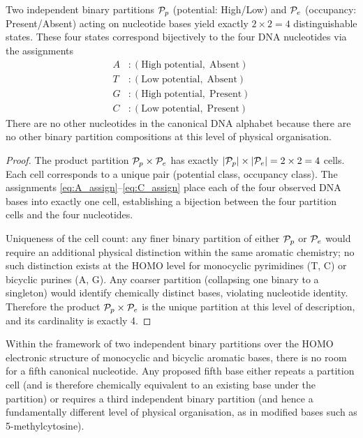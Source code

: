 \begin{theorem}
\label{thm:four_state}
Two independent binary partitions $\mathcal{P}_p$ (potential: High/Low) and
$\mathcal{P}_e$ (occupancy: Present/Absent) acting on nucleotide bases yield
exactly $2 \times 2 = 4$ distinguishable states. These four states
correspond bijectively to the four DNA nucleotides via the assignments
\begin{align}
  A &: (\mathrm{High\; potential},\; \mathrm{Absent}) \label{eq:A_assign}\\
  T &: (\mathrm{Low\; potential},\; \mathrm{Absent})  \label{eq:T_assign}\\
  G &: (\mathrm{High\; potential},\; \mathrm{Present})\label{eq:G_assign}\\
  C &: (\mathrm{Low\; potential},\; \mathrm{Present}) \label{eq:C_assign}
\end{align}
There are no other nucleotides in the canonical DNA alphabet because there
are no other binary partition compositions at this level of physical
organisation.
\end{theorem}

\begin{proof}
The product partition $\mathcal{P}_p \times \mathcal{P}_e$ has exactly
$|\mathcal{P}_p| \times |\mathcal{P}_e| = 2 \times 2 = 4$ cells.
Each cell corresponds to a unique pair (potential class, occupancy class).
The assignments \eqref{eq:A_assign}--\eqref{eq:C_assign} place each of the
four observed DNA bases into exactly one cell, establishing a bijection
between the four partition cells and the four nucleotides.

Uniqueness of the cell count: any finer binary partition of either
$\mathcal{P}_p$ or $\mathcal{P}_e$ would require an additional physical distinction
within the same aromatic chemistry; no such distinction exists at the HOMO
level for monocyclic pyrimidines (T, C) or bicyclic purines (A, G).
Any coarser partition (collapsing one binary to a singleton) would
identify chemically distinct bases, violating nucleotide identity.
Therefore the product $\mathcal{P}_p \times \mathcal{P}_e$ is the unique partition
at this level of description, and its cardinality is exactly 4.
\end{proof}

\begin{corollary}
\label{cor:no_fifth}
Within the framework of two independent binary partitions over the HOMO
electronic structure of monocyclic and bicyclic aromatic bases, there is no
room for a fifth canonical nucleotide. Any proposed fifth base either
repeats a partition cell (and is therefore chemically equivalent to an
existing base under the partition) or requires a third independent binary
partition (and hence a fundamentally different level of physical organisation,
as in modified bases such as 5-methylcytosine).
\end{corollary}

